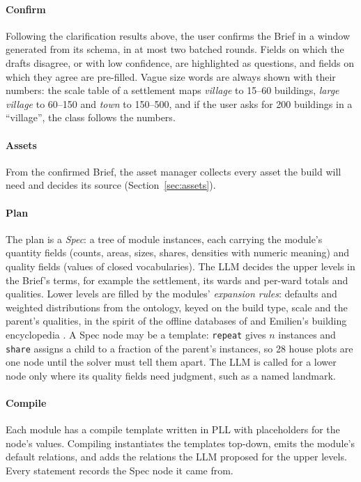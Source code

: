 \documentclass[conference]{IEEEtran}
\begin{document}
\paragraph{Confirm} Following the clarification results above, the user confirms the
Brief in a window generated from its schema, in at most two batched rounds. Fields on
which the drafts disagree, or with low confidence, are highlighted as questions, and
fields on which they agree are pre-filled. Vague size words are always shown with their
numbers: the scale table of a settlement maps \emph{village} to 15--60 buildings,
\emph{large village} to 60--150 and \emph{town} to 150--500, and if the user asks for 200
buildings in a ``village'', the class follows the numbers.

\paragraph{Assets} From the confirmed Brief, the asset manager collects every asset the
build will need and decides its source (Section~\ref{sec:assets}).

\paragraph{Plan} The plan is a \emph{Spec}: a tree of module instances, each carrying the
module's quantity fields (counts, areas, sizes, shares, densities with numeric meaning)
and quality fields (values of closed vocabularies). The LLM decides the upper levels in
the Brief's terms, for example the settlement, its wards and per-ward totals and
qualities. Lower levels are filled by the modules' \emph{expansion rules}: defaults and
weighted distributions from the ontology, keyed on the build type, scale and the
parent's qualities, in the spirit of the offline databases of \cite{xu2025database} and
Emilien's building encyclopedia \cite{emilien2012}. A Spec node may be a template:
\texttt{repeat} gives $n$ instances and \texttt{share} assigns a child to a fraction of the
parent's instances, so 28 house plots are one node until the solver must tell them
apart. The LLM is called for a lower node only where its quality fields need judgment,
such as a named landmark.

\paragraph{Compile} Each module has a compile template written in PLL with placeholders
for the node's values. Compiling instantiates the templates top-down, emits the module's
default relations, and adds the relations the LLM proposed for the upper levels. Every
statement records the Spec node it came from.
\end{document}
